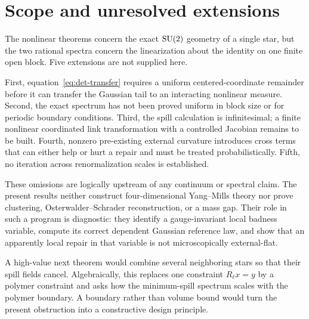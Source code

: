 \section{Scope and unresolved extensions}
\label{sec:limits}

The nonlinear theorems concern the exact $\mathrm{SU}(2)$ geometry of a single star, but
the two rational spectra concern the linearization about the identity on one
finite open block.  Five extensions are not supplied here.

First, equation~\eqref{eq:det-transfer} requires a uniform centered-coordinate
remainder before it can transfer the Gaussian tail to an interacting
nonlinear measure.  Second, the exact spectrum has not been proved uniform in
block size or for periodic boundary conditions.  Third, the spill calculation
is infinitesimal; a finite nonlinear coordinated link transformation with a
controlled Jacobian remains to be built.  Fourth, nonzero pre-existing
external curvature introduces cross terms that can either help or hurt a
repair and must be treated probabilistically.  Fifth, no iteration across
renormalization scales is established.

These omissions are logically upstream of any continuum or spectral claim.
The present results neither construct four-dimensional Yang--Mills theory nor
prove clustering, Osterwalder--Schrader reconstruction, or a mass gap.  Their
role in such a program is diagnostic: they identify a gauge-invariant local
badness variable, compute its correct dependent Gaussian reference law, and
show that an apparently local repair in that variable is not microscopically
external-flat.

A high-value next theorem would combine several neighboring stars so that
their spill fields cancel.  Algebraically, this replaces one constraint
$R_\ell x=y$ by a polymer constraint and asks how the minimum-spill spectrum
scales with the polymer boundary.  A boundary rather than volume bound would
turn the present obstruction into a constructive design principle.
